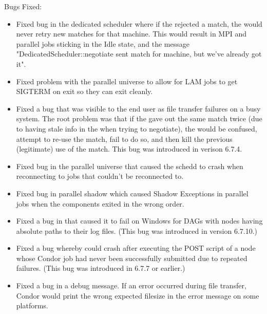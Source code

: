 \noindent Bugs Fixed:

\begin{itemize}


\item Fixed bug in the dedicated scheduler where if the  
rejected a match, the  would never retry new matches 
for that machine.  This would result in MPI and parallel jobs sticking 
in the Idle state, and the message "DedicatedScheduler::negotiate sent 
match for machine, but we've already got it".

\item Fixed problem with the parallel universe to allow for LAM jobs
to get SIGTERM on exit so they can exit cleanly.

\item Fixed a bug that was visible to the end user as file transfer
  failures on a busy system.
  The root problem was that if the  gave out the
  same match twice (due to having stale info in the 
  when trying to negotiate), the  would be confused,
  attempt to re-use the match, fail to do so, and then kill the
  previous (legitimate) use of the match.
  This bug was introduced in verison 6.7.4.

\item Fixed bug in the parallel universe that caused the schedd to
crash when reconnecting to jobs that couldn't be reconnected to.

\item Fixed bug in parallel shadow which caused Shadow Exceptions
in parallel jobs when the components exited in the wrong order.

\item Fixed a bug in  that caused it to fail on Windows
for DAGs with nodes having absolute paths to their log files.  (This bug
was introduced in version 6.7.10.)

\item Fixed a bug whereby  could crash after executing
the POST script of a node whose Condor job had never been successfully
submitted due to repeated  failures.  (This bug was
introduced in 6.7.7 or earlier.)

\item Fixed a bug in a debug message.  If an error occurred during file
transfer, Condor would print the wrong expected filesize in the error message
on some platforms.


\end{itemize}
